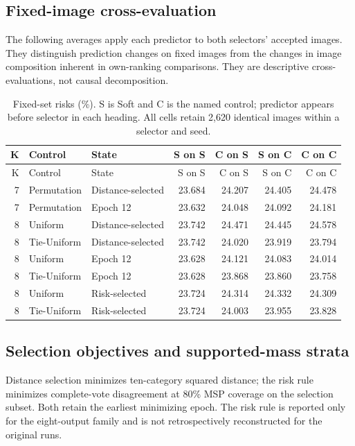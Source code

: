 \subsection{Fixed-image cross-evaluation}
The following averages apply each predictor to both selectors' accepted images. They distinguish prediction changes on fixed images from the changes in image composition inherent in own-ranking comparisons. They are descriptive cross-evaluations, not causal decomposition.

\begingroup\small\setlength{\tabcolsep}{4pt}\setlength{\LTcapwidth}{\linewidth}
\begin{longtable}{rllrrrr}
\caption{Fixed-set risks (\%). S is Soft and C is the named control; predictor appears before selector in each heading. All cells retain 2,620 identical images within a selector and seed.}\label{tab:new-fixed-sets}\\
\toprule K & Control & State & S on S & C on S & S on C & C on C\\\midrule\endfirsthead
\toprule K & Control & State & S on S & C on S & S on C & C on C\\\midrule\endhead
7 & Permutation & Distance-selected & 23.684 & 24.207 & 24.405 & 24.478\\
7 & Permutation & Epoch 12 & 23.632 & 24.048 & 24.092 & 24.181\\
8 & Uniform & Distance-selected & 23.742 & 24.471 & 24.445 & 24.578\\
8 & Tie-Uniform & Distance-selected & 23.742 & 24.020 & 23.919 & 23.794\\
8 & Uniform & Epoch 12 & 23.628 & 24.121 & 24.083 & 24.014\\
8 & Tie-Uniform & Epoch 12 & 23.628 & 23.868 & 23.860 & 23.758\\
8 & Uniform & Risk-selected & 23.724 & 24.314 & 24.332 & 24.309\\
8 & Tie-Uniform & Risk-selected & 23.724 & 24.003 & 23.955 & 23.828\\
\bottomrule\end{longtable}\endgroup

\subsection{Selection objectives and supported-mass strata}
Distance selection minimizes ten-category squared distance; the risk rule minimizes complete-vote disagreement at 80\% MSP coverage on the selection subset. Both retain the earliest minimizing epoch. The risk rule is reported only for the eight-output family and is not retrospectively reconstructed for the original runs.

